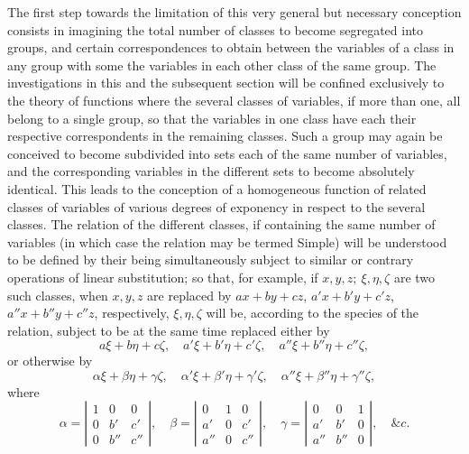 \documentclass[11pt]{article}
\newcommand{\sourcepage}[1]{\marginpar{\scriptsize p.~#1}}
\begin{document}
{{\sourcepage{285}
The first step towards the limitation of this very general but necessary conception consists in imagining the total number of classes to become segregated into groups, and certain correspondences to obtain between the variables of a class in any group with some the variables in each other class of the same group. The investigations in this and the subsequent section will be confined exclusively to the theory of functions where the several classes of variables, if more than one, all belong to a single group, so that the variables in one class have each their respective correspondents in the remaining classes. Such a group may again be conceived to become subdivided into sets each of the same number of variables, and the corresponding variables in the different sets to become absolutely identical. This leads to the conception of a homogeneous function of related classes of variables of various degrees of exponency in respect to the several classes. The relation of the different classes, if containing the same number of variables (in which case the relation may be termed Simple) will be understood to be defined by their being simultaneously subject to similar or contrary operations of linear substitution; so that, for example, if $x,y,z;\ \xi,\eta,\zeta$ are two such classes, when $x,y,z$ are replaced by $ax+by+cz$, $a'x+b'y+c'z$, $a''x+b''y+c''z$, respectively, $\xi,\eta,\zeta$ will be, according to the species of the relation, subject to be at the same time replaced either by
\[
a\xi+b\eta+c\zeta,
\quad a'\xi+b'\eta+c'\zeta,
\quad a''\xi+b''\eta+c''\zeta,
\]
or otherwise by
\[
\alpha\xi+\beta\eta+\gamma\zeta,
\quad \alpha'\xi+\beta'\eta+\gamma'\zeta,
\quad \alpha''\xi+\beta''\eta+\gamma''\zeta,
\]
where
\[
\alpha=\left|\begin{array}{ccc}1&0&0\\0&b'&c'\\0&b''&c''\end{array}\right|,
\quad
\beta=\left|\begin{array}{ccc}0&1&0\\a'&0&c'\\a''&0&c''\end{array}\right|,
\quad
\gamma=\left|\begin{array}{ccc}0&0&1\\a'&b'&0\\a''&b''&0\end{array}\right|,
\quad \&c.
\]
}}
\end{document}
